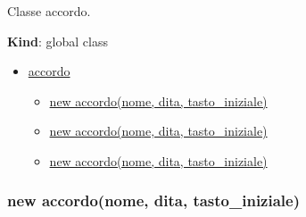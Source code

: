 Classe accordo.

\textbf{Kind}: global class

\begin{itemize}
\tightlist
\item
  \protect\hyperlink{accordo}{accordo}

  \begin{itemize}
  \tightlist
  \item
    \protect\hyperlink{new_accordo_new}{new accordo(nome, dita,
    tasto\_iniziale)}
  \item
    \protect\hyperlink{new_accordo_new}{new accordo(nome, dita,
    tasto\_iniziale)}
  \item
    \protect\hyperlink{new_accordo_new}{new accordo(nome, dita,
    tasto\_iniziale)}
  \end{itemize}
\end{itemize}

\protect\hypertarget{new_accordo_new}{}{}

\hypertarget{new-accordonome-dita-tasto_iniziale-6}{%
\subsubsection{new accordo(nome, dita,
tasto\_iniziale)}\label{new-accordonome-dita-tasto_iniziale-6}}

